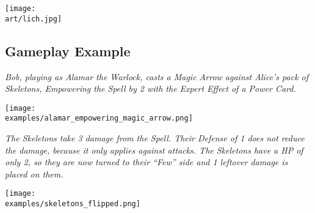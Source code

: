 \clearpage


\begin{multicols}{2}

\texttt{[image: \\art/lich.jpg]}

\subsection*{Gameplay Example}

\textit{Bob, playing as Alamar the Warlock, casts a Magic Arrow against Alice's pack of Skeletons, Empowering  the Spell by 2 with the Expert  Effect  of a Power Card.}

\medskip

\texttt{[image: \\examples/alamar\_empowering\_magic\_arrow.png]}

\medskip

\textit{The Skeletons take 3 damage  from the Spell.
  Their Defense  of 1 does not reduce the damage, because it only applies against attacks.
  The Skeletons have a HP  of only 2, so they are now turned to their ``Few'' side and 1 leftover damage  is placed on them.
}

\bigskip

\texttt{[image: \\examples/skeletons\_flipped.png]}

\end{multicols}

